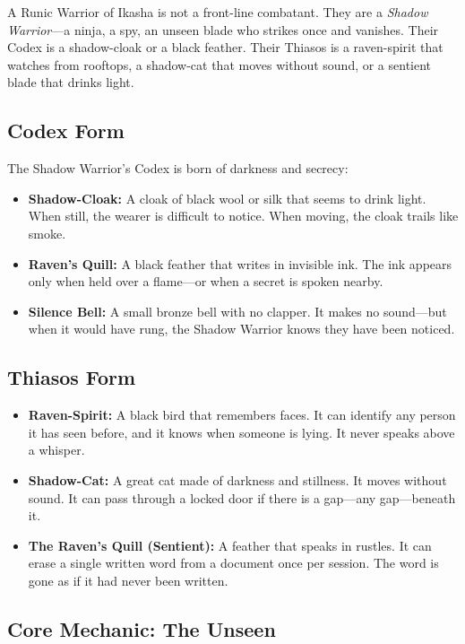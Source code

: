 A Runic Warrior of Ikasha is not a front-line combatant. They are a \textit{Shadow Warrior}—a ninja, a spy, an unseen blade who strikes once and vanishes. Their Codex is a shadow-cloak or a black feather. Their Thiasos is a raven-spirit that watches from rooftops, a shadow-cat that moves without sound, or a sentient blade that drinks light.

\subsection{Codex Form}

The Shadow Warrior's Codex is born of darkness and secrecy:

\begin{itemize}
\item \textbf{Shadow-Cloak:} A cloak of black wool or silk that seems to drink light. When still, the wearer is difficult to notice. When moving, the cloak trails like smoke.
\item \textbf{Raven's Quill:} A black feather that writes in invisible ink. The ink appears only when held over a flame—or when a secret is spoken nearby.
\item \textbf{Silence Bell:} A small bronze bell with no clapper. It makes no sound—but when it would have rung, the Shadow Warrior knows they have been noticed.
\end{itemize}

\subsection{Thiasos Form}

\begin{itemize}
\item \textbf{Raven-Spirit:} A black bird that remembers faces. It can identify any person it has seen before, and it knows when someone is lying. It never speaks above a whisper.
\item \textbf{Shadow-Cat:} A great cat made of darkness and stillness. It moves without sound. It can pass through a locked door if there is a gap—any gap—beneath it.
\item \textbf{The Raven's Quill (Sentient):} A feather that speaks in rustles. It can erase a single written word from a document once per session. The word is gone as if it had never been written.
\end{itemize}

\subsection{Core Mechanic: The Unseen}

